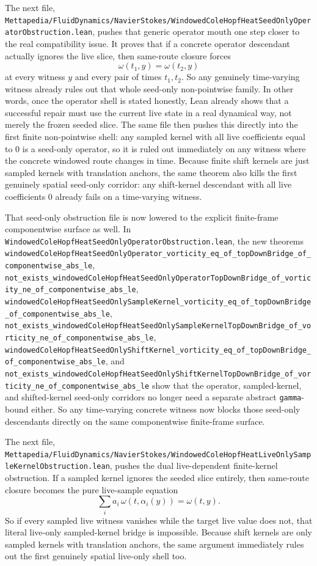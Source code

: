 \documentclass[11pt]{article}
\theoremstyle{remark}
\begin{document}
The next file,
\texttt{Mettapedia/FluidDynamics/NavierStokes/WindowedColeHopfHeatSeedOnlyOperatorObstruction.lean},
pushes that generic operator mouth one step closer to the real compatibility
issue.  It proves that if a concrete operator descendant actually ignores the
live slice, then same-route closure forces
\[
  \omega(t_1,y)=\omega(t_2,y)
\]
at every witness \(y\) and every pair of times \(t_1,t_2\).  So any genuinely
time-varying witness already rules out that whole seed-only non-pointwise
family.  In other words, once the operator shell is stated honestly, Lean
already shows that a successful repair must use the current live state in a real
dynamical way, not merely the frozen seeded slice.  The same file then pushes
this directly into the first finite non-pointwise shell: any sampled kernel with
all live coefficients equal to \(0\) is a seed-only operator, so it is ruled out
immediately on any witness where the concrete windowed route changes in time.
Because finite shift kernels are just sampled kernels with translation anchors,
the same theorem also kills the first genuinely spatial seed-only corridor:
any shift-kernel descendant with all live coefficients \(0\) already fails on a
time-varying witness.

That seed-only obstruction file is now lowered to the explicit finite-frame
componentwise surface as well.  In
\texttt{WindowedColeHopfHeatSeedOnlyOperatorObstruction.lean}, the new
theorems
\texttt{windowedColeHopfHeatSeedOnlyOperator\_vorticity\_eq\_of\_topDownBridge\_of\_componentwise\_abs\_le},
\texttt{not\_exists\_windowedColeHopfHeatSeedOnlyOperatorTopDownBridge\_of\_vorticity\_ne\_of\_componentwise\_abs\_le},
\texttt{windowedColeHopfHeatSeedOnlySampleKernel\_vorticity\_eq\_of\_topDownBridge\_of\_componentwise\_abs\_le},
\texttt{not\_exists\_windowedColeHopfHeatSeedOnlySampleKernelTopDownBridge\_of\_vorticity\_ne\_of\_componentwise\_abs\_le},
\texttt{windowedColeHopfHeatSeedOnlyShiftKernel\_vorticity\_eq\_of\_topDownBridge\_of\_componentwise\_abs\_le},
and
\texttt{not\_exists\_windowedColeHopfHeatSeedOnlyShiftKernelTopDownBridge\_of\_vorticity\_ne\_of\_componentwise\_abs\_le}
show that the operator, sampled-kernel, and shifted-kernel seed-only
corridors no longer need a separate abstract \texttt{gamma}-bound either.  So
any time-varying concrete witness now blocks those seed-only descendants
directly on the same componentwise finite-frame surface.

The next file,
\texttt{Mettapedia/FluidDynamics/NavierStokes/WindowedColeHopfHeatLiveOnlySampleKernelObstruction.lean},
pushes the dual live-dependent finite-kernel obstruction.  If a sampled kernel
ignores the seeded slice entirely, then same-route closure becomes the pure
live-sample equation
\[
  \sum_i a_i\,\omega(t,\alpha_i(y))=\omega(t,y).
\]
So if every sampled live witness vanishes while the target live value does not,
that literal live-only sampled-kernel bridge is impossible.  Because shift
kernels are only sampled kernels with translation anchors, the same argument
immediately rules out the first genuinely spatial live-only shell too.
\end{document}

